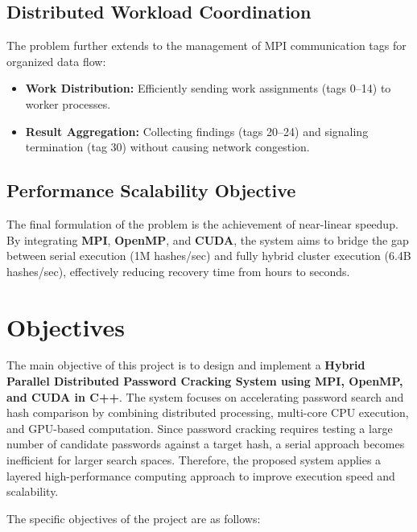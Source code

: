 \documentclass[12pt,a4paper]{article}
\begin{document}
\subsection{Distributed Workload Coordination}
The problem further extends to the management of MPI communication tags for organized data flow:
\begin{itemize}
    \item \textbf{Work Distribution:} Efficiently sending work assignments (tags 0--14) to worker processes.
    \item \textbf{Result Aggregation:} Collecting findings (tags 20--24) and signaling termination (tag 30) without causing network congestion.
\end{itemize}

\subsection{Performance Scalability Objective}
The final formulation of the problem is the achievement of near-linear speedup. By integrating \textbf{MPI}, \textbf{OpenMP}, and \textbf{CUDA}, the system aims to bridge the gap between serial execution (1M hashes/sec) and fully hybrid cluster execution (6.4B hashes/sec), effectively reducing recovery time from hours to seconds.

%	
%	

	\section{Objectives}

The main objective of this project is to design and implement a \textbf{Hybrid Parallel Distributed Password Cracking System using MPI, OpenMP, and CUDA in C++}. The system focuses on accelerating password search and hash comparison by combining distributed processing, multi-core CPU execution, and GPU-based computation. Since password cracking requires testing a large number of candidate passwords against a target hash, a serial approach becomes inefficient for larger search spaces. Therefore, the proposed system applies a layered high-performance computing approach to improve execution speed and scalability.

The specific objectives of the project are as follows:
\end{document}
